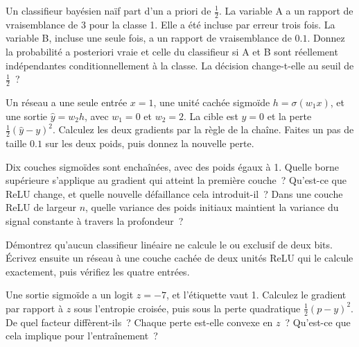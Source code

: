 \begin{question}\label{iq:iv1:machine-learning:20}
Un classifieur bayésien naïf part d'un a priori de $\frac12$. La variable A a un rapport de vraisemblance de 3 pour la classe 1. Elle a été incluse par erreur trois fois. La variable B, incluse une seule fois, a un rapport de vraisemblance de $0.1$. Donnez la probabilité a posteriori vraie et celle du classifieur si A et B sont réellement indépendantes conditionnellement à la classe. La décision change-t-elle au seuil de $\frac12$~?
\end{question}

\begin{question}\label{iq:iv1:machine-learning:21}
Un réseau a une seule entrée $x = 1$, une unité cachée sigmoïde $h = \sigma(w_1x)$, et une sortie $\hat{y} = w_2h$, avec $w_1 = 0$ et $w_2 = 2$. La cible est $y = 0$ et la perte $\frac12(\hat{y} - y)^2$. Calculez les deux gradients par la règle de la chaîne. Faites un pas de taille $0.1$ sur les deux poids, puis donnez la nouvelle perte.
\end{question}

\begin{question}\label{iq:iv1:machine-learning:22}
Dix couches sigmoïdes sont enchaînées, avec des poids égaux à 1. Quelle borne supérieure s'applique au gradient qui atteint la première couche~? Qu'est-ce que ReLU change, et quelle nouvelle défaillance cela introduit-il~? Dans une couche ReLU de largeur $n$, quelle variance des poids initiaux maintient la variance du signal constante à travers la profondeur~?
\end{question}

\begin{question}\label{iq:iv1:machine-learning:23}
Démontrez qu'aucun classifieur linéaire ne calcule le ou exclusif de deux bits. Écrivez ensuite un réseau à une couche cachée de deux unités ReLU qui le calcule exactement, puis vérifiez les quatre entrées.
\end{question}

\begin{question}\label{iq:iv1:machine-learning:24}
Une sortie sigmoïde a un logit $z = -7$, et l'étiquette vaut 1. Calculez le gradient par rapport à $z$ sous l'entropie croisée, puis sous la perte quadratique $\frac12(p - y)^2$. De quel facteur diffèrent-ils~? Chaque perte est-elle convexe en $z$~? Qu'est-ce que cela implique pour l'entraînement~?
\end{question}

